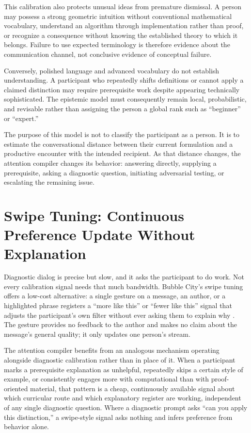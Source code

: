 \documentclass[11pt]{article}
\begin{document}
This calibration also protects unusual ideas from premature dismissal. A person may possess a strong geometric intuition without conventional mathematical vocabulary, understand an algorithm through implementation rather than proof, or recognize a consequence without knowing the established theory to which it belongs. Failure to use expected terminology is therefore evidence about the communication channel, not conclusive evidence of conceptual failure.

Conversely, polished language and advanced vocabulary do not establish understanding. A participant who repeatedly shifts definitions or cannot apply a claimed distinction may require prerequisite work despite appearing technically sophisticated. The epistemic model must consequently remain local, probabilistic, and revisable rather than assigning the person a global rank such as ``beginner'' or ``expert.''

The purpose of this model is not to classify the participant as a person. It is to estimate the conversational distance between their current formulation and a productive encounter with the intended recipient. As that distance changes, the attention compiler changes its behavior: answering directly, supplying a prerequisite, asking a diagnostic question, initiating adversarial testing, or escalating the remaining issue.

\section{Swipe Tuning: Continuous Preference Update Without Explanation}

Diagnostic dialog is precise but slow, and it asks the participant to do work. Not every calibration signal needs that much bandwidth. Bubble City's swipe tuning offers a low-cost alternative: a single gesture on a message, an author, or a highlighted phrase registers a ``more like this'' or ``fewer like this'' signal that adjusts the participant's own filter without ever asking them to explain why \cite{anderson2022bubblecity}. The gesture provides no feedback to the author and makes no claim about the message's general quality; it only updates one person's stream.

The attention compiler benefits from an analogous mechanism operating alongside diagnostic calibration rather than in place of it. When a participant marks a prerequisite explanation as unhelpful, repeatedly skips a certain style of example, or consistently engages more with computational than with proof-oriented material, that pattern is a cheap, continuously available signal about which curricular route and which explanatory register are working, independent of any single diagnostic question. Where a diagnostic prompt asks ``can you apply this distinction,'' a swipe-style signal asks nothing and infers preference from behavior alone.
\end{document}
